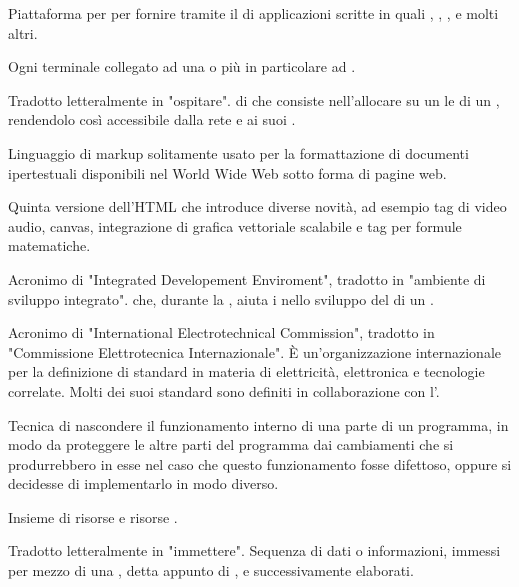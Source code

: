{Piattaforma  per per fornire  tramite il  di applicazioni scritte in  quali , , , e molti altri.}

{Ogni terminale collegato ad una  o più in particolare ad .}

{Tradotto letteralmente in "ospitare".  di  che consiste nell'allocare su un  le  di un , rendendolo così accessibile dalla rete  e ai suoi .}

{Linguaggio di markup solitamente usato per la formattazione di documenti ipertestuali disponibili nel World Wide Web sotto forma di pagine web.}

{Quinta versione dell'HTML che introduce diverse novità, ad esempio tag di video audio, canvas, integrazione di grafica vettoriale scalabile e tag per formule matematiche.}




{Acronimo di "Integrated Developement Enviroment", tradotto in "ambiente di sviluppo integrato".  che, durante la , aiuta i  nello sviluppo del  di un .}

{Acronimo di "International Electrotechnical Commission", tradotto in "Commissione Elettrotecnica Internazionale". \`{E} un'organizzazione internazionale per la definizione di standard in materia di elettricità, elettronica e tecnologie correlate. Molti dei suoi standard sono definiti in collaborazione con l'.}

{Tecnica di nascondere il funzionamento interno di una parte di un programma, in modo da proteggere le altre parti del programma dai cambiamenti che si produrrebbero in esse nel caso che questo funzionamento fosse difettoso, oppure si decidesse di implementarlo in modo diverso.}

{Insieme di risorse  e risorse .}

{Tradotto letteralmente in "immettere". Sequenza di dati o informazioni, immessi per mezzo di una , detta appunto di , e successivamente elaborati.}

